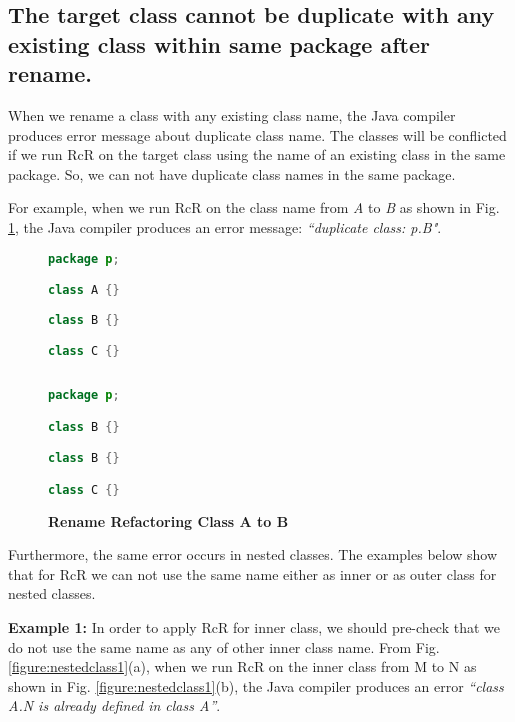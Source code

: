 \subsection{The target class cannot be duplicate with any existing class within same package after rename.}

When we rename a class with any existing class name, the Java compiler produces error message about duplicate class name. The classes will be conflicted if we run RcR on the target class using the name of an existing class in the same package. So, we can not have duplicate class names in the same package. 

For example, when we run RcR on the class name from \textsl{A} to \textsl{B} as shown in Fig. \ref{fig:afterrr}, the Java compiler produces an error message: \textit{``duplicate class: p.B"}.

\begin{figure}[th]
\centering
\begin{minipage}[t]{0.45\linewidth}
\begin{lstlisting}[language=java, basicstyle=\scriptsize\ttfamily,frame=single]
package p;

class A {}
	
class B {}

class C {}
 
\end{lstlisting}
\end{minipage}
\hfill
\begin{minipage}[t]{0.45\linewidth}
\begin{lstlisting}[language=java, basicstyle=\scriptsize\ttfamily,frame=single]
package p;

class B {}	

class B {}

class C {}

\end{lstlisting}
\end{minipage}
\caption{\textbf{Rename Refactoring Class A to B}}
\label{fig:afterrr}
\end{figure}


Furthermore, the same error occurs in nested classes. The examples below show that for RcR we can not use the same name either as inner or as outer class for nested classes.


\textbf{Example 1:} In order to apply RcR for inner class, we should pre-check that we do not use the same name as any of other inner class name. From Fig. \ref{figure:nestedclass1}(a), when we run RcR on the inner class from M to N as shown in Fig. \ref{figure:nestedclass1}(b), the Java compiler produces an error \textit{``class A.N is already defined in class A''}. 

